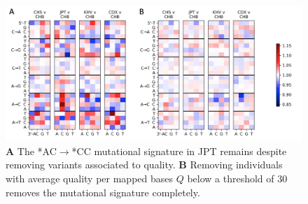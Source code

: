 \documentclass[custompaper]{MBE}%
\begin{document}
\begin{figure}[h]
\includegraphics[width=\hsize,keepaspectratio]{./Figures/MutationSpectrum_cutOff.png}
\caption{\textbf{A} 
The  *AC${\rightarrow}$*CC mutational signature in JPT remains despite removing variants associated to quality. 
\textbf{B} 
Removing individuals with average quality per mapped bases $Q$ below a threshold of 30 removes the mutational signature completely. }
\label{MutSpect}
\end{figure}
\end{document}
